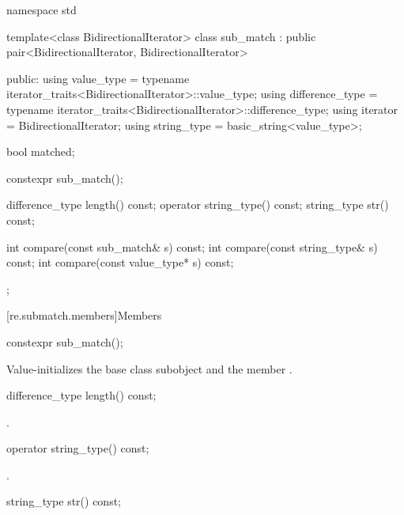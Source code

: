 \begin{codeblock}
namespace std {
  template<class BidirectionalIterator>
    class sub_match : public pair<BidirectionalIterator, BidirectionalIterator> {
    public:
      using value_type      =
              typename iterator_traits<BidirectionalIterator>::value_type;
      using difference_type =
              typename iterator_traits<BidirectionalIterator>::difference_type;
      using iterator        = BidirectionalIterator;
      using string_type     = basic_string<value_type>;

      bool matched;

      constexpr sub_match();

      difference_type length() const;
      operator string_type() const;
      string_type str() const;

      int compare(const sub_match& s) const;
      int compare(const string_type& s) const;
      int compare(const value_type* s) const;
    };
}
\end{codeblock}


[re.submatch.members]{Members}

%
\begin{itemdecl}
constexpr sub_match();
\end{itemdecl}

\begin{itemdescr}
\pnum
\effects
Value-initializes the  base class subobject and the member
.
\end{itemdescr}

%
\begin{itemdecl}
difference_type length() const;
\end{itemdecl}

\begin{itemdescr}
\pnum
\returns
{}.
\end{itemdescr}

%
\begin{itemdecl}
operator string_type() const;
\end{itemdecl}

\begin{itemdescr}
\pnum
\returns
{}.
\end{itemdescr}

%
\begin{itemdecl}
string_type str() const;
\end{itemdecl}

